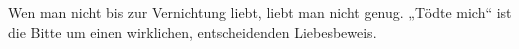 Wen man nicht bis zur Vernichtung liebt, liebt man nicht genug. „Tödte mich“ ist die Bitte um einen wirklichen, entscheidenden Liebesbeweis.
\par

